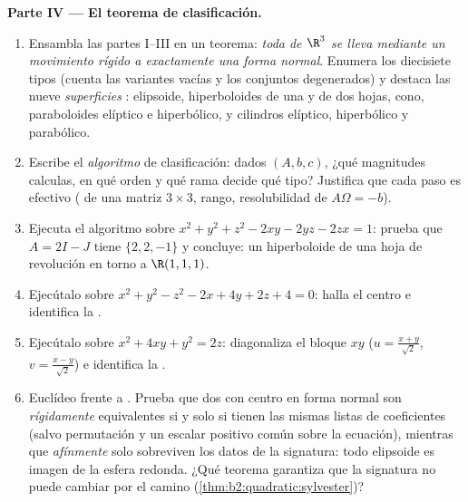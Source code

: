 \begin{problem}
\medskip
\noindent\textbf{Parte IV --- El teorema de clasificación.}
\begin{enumerate}[resume]
  \item Ensambla las partes I--III en un teorema: \emph{toda
         de $\R^3$ se lleva mediante un movimiento rígido a
        exactamente una forma normal}. Enumera los diecisiete tipos
         (cuenta las variantes vacías y los conjuntos
        degenerados) y destaca las nueve \emph{superficies}
        : elipsoide, hiperboloides de una y de dos hojas,
        cono, paraboloides elíptico e hiperbólico, y cilindros
        elíptico, hiperbólico y parabólico.
  \item Escribe el \emph{algoritmo} de clasificación: dados $(A, b,
        c)$, ¿qué magnitudes calculas, en qué orden y qué rama decide
        qué tipo? Justifica que cada paso es efectivo
        ( de una matriz  $3\times3$, rango,
        resolubilidad de $A\Omega = -b$).
  \item Ejecuta el algoritmo sobre $x^2 + y^2 + z^2 - 2xy - 2yz -
        2zx = 1$: prueba que $A = 2I - J$ tiene  $\{2, 2,
        -1\}$ y concluye: un hiperboloide de una hoja de revolución
        en torno a $\R(1,1,1)$.
  \item Ejecútalo sobre $x^2 + y^2 - z^2 - 2x + 4y + 2z + 4 = 0$:
        halla el centro e identifica la .
  \item Ejecútalo sobre $x^2 + 4xy + y^2 = 2z$: diagonaliza el bloque
        $xy$ ($u = \frac{x+y}{\sqrt2}$, $v = \frac{x-y}{\sqrt2}$) e
        identifica la .
  \item Euclídeo frente a . Prueba que dos  con centro
        en forma normal son \emph{rígidamente} equivalentes si y solo
        si tienen las mismas listas de coeficientes (salvo
        permutación y un escalar positivo común sobre la ecuación),
        mientras que \emph{afínmente} solo sobreviven los datos de la
        signatura: todo elipsoide es imagen  de la esfera
        redonda. ¿Qué teorema garantiza que la signatura no puede
        cambiar por el camino (\cref{thm:b2:quadratic:sylvester})?
\end{enumerate}


\end{problem}
